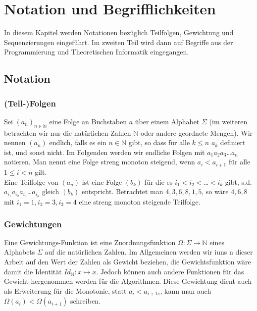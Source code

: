 \section{Notation und Begrifflichkeiten}
In diesem Kapitel werden Notationen bezüglich Teilfolgen, Gewichtung und Sequenzierungen eingeführt. Im zweiten Teil wird dann auf Begriffe aus der Programmierung und Theoretischen Informatik eingegangen.

\subsection{Notation}
\subsubsection{(Teil-)Folgen}
Sei $(a_n)_{n\in\mathbb{N}}$ eine Folge an Buchstaben $a$ über einem Alphabet $\Sigma$ (im weiteren betrachten wir nur die natürlichen Zahlen $\mathbb{N}$ oder andere geordnete Mengen). Wir nennen $(a_n)$ endlich, falls es ein $n\in\mathbb{N}$ gibt, so dass für alle $k\leq n$ $a_k$ definiert ist, und sonst nicht. Im Folgenden werden wir endliche Folgen mit $a_1a_2a_3$\dots$a_n$ notieren. Man nennt eine Folge streng monoton steigend, wenn $a_i < a_{i+1}$ für alle $1\leq i < n$ gilt.\\
Eine Teilfolge von $(a_n)$ ist eine Folge $(b_k)$ für die es $i_1<i_2<$\dots$<i_k$ gibt, s.d.$a_{i_1}a_{i_2}a_{i_3}$\dots$a_{i_k}$ gleich $(b_k)$ entspricht. Betrachtet man $4,3,6,8,1,5$, so wäre $4,6,8$ mit $i_1=1,i_2=3,i_3=4$ eine streng monoton steigende Teilfolge.

\subsubsection{Gewichtungen}
Eine Gewichtungs-Funktion ist eine Zuordnungsfunktion $\Omega:\Sigma\rightarrow\mathbb{N}$ eines Alphabets $\Sigma$ auf die natürlichen Zahlen. Im Allgemeinen werden wir iuns n dieser Arbeit auf den Wert der Zahlen als Gewicht beziehen, die Gewichtsfunktion wäre damit die Identität $Id_\mathbb{N}:x \mapsto x$. Jedoch können auch andere Funktionen für das Gewicht hergenommen werden für die Algorithmen. Diese Gewichtung dient auch als Erweiterung für die Monotonie, statt $a_i<a_{i+1s}$, kann man auch $\Omega (a_i) < \Omega (a_{i+1})$ schreiben. 

